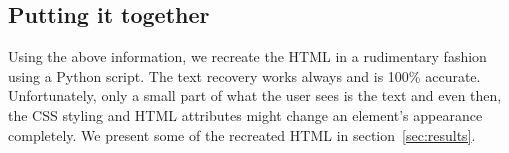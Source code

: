 \subsection{Putting it together}
Using the above information, we recreate the HTML in a rudimentary
fashion using a Python script. The text recovery works always and is
100\% accurate. Unfortunately, only a small part of what the user sees
is the text and even then, the CSS styling and HTML attributes might
change an element's appearance completely. We present some of the
recreated HTML in section~\ref{sec:results}.
